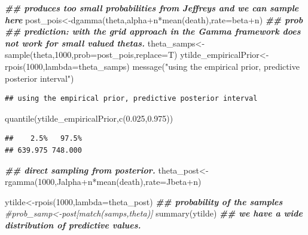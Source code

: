 \documentclass[
]{book}
\newenvironment{Shaded}{\begin{snugshade}}{\end{snugshade}}
\newcommand{\AttributeTok}[1]{\textcolor[rgb]{0.77,0.63,0.00}{#1}}
\newcommand{\CommentTok}[1]{\textcolor[rgb]{0.56,0.35,0.01}{\textit{#1}}}
\newcommand{\DecValTok}[1]{\textcolor[rgb]{0.00,0.00,0.81}{#1}}
\newcommand{\DocumentationTok}[1]{\textcolor[rgb]{0.56,0.35,0.01}{\textbf{\textit{#1}}}}
\newcommand{\FloatTok}[1]{\textcolor[rgb]{0.00,0.00,0.81}{#1}}
\newcommand{\FunctionTok}[1]{\textcolor[rgb]{0.00,0.00,0.00}{#1}}
\newcommand{\NormalTok}[1]{#1}
\newcommand{\OtherTok}[1]{\textcolor[rgb]{0.56,0.35,0.01}{#1}}
\newcommand{\SpecialCharTok}[1]{\textcolor[rgb]{0.00,0.00,0.00}{#1}}
\newcommand{\StringTok}[1]{\textcolor[rgb]{0.31,0.60,0.02}{#1}}
\theoremstyle{definition}
\theoremstyle{definition}
\theoremstyle{definition}
\theoremstyle{definition}
\theoremstyle{remark}
\begin{document}
\begin{Shaded}
\begin{Highlighting}[]
 \DocumentationTok{\#\# produces too small probabilities from Jeffrey\textquotesingle{}s and we can sample here}
\NormalTok{ post\_pois}\OtherTok{\textless{}{-}}\FunctionTok{dgamma}\NormalTok{(theta,alpha}\SpecialCharTok{+}\NormalTok{n}\SpecialCharTok{*}\FunctionTok{mean}\NormalTok{(death),}\AttributeTok{rate=}\NormalTok{beta}\SpecialCharTok{+}\NormalTok{n) }\DocumentationTok{\#\# prob}
\DocumentationTok{\#\#  prediction:  with the grid approach in the Gamma framework does not work for small valued thetas.}
\NormalTok{ theta\_samps}\OtherTok{\textless{}{-}}\FunctionTok{sample}\NormalTok{(theta,}\DecValTok{1000}\NormalTok{,}\AttributeTok{prob=}\NormalTok{post\_pois,}\AttributeTok{replace=}\NormalTok{T)}
\NormalTok{  ytilde\_empiricalPrior}\OtherTok{\textless{}{-}}\FunctionTok{rpois}\NormalTok{(}\DecValTok{1000}\NormalTok{,}\AttributeTok{lambda=}\NormalTok{theta\_samps)}
  \FunctionTok{message}\NormalTok{(}\StringTok{"using the empirical prior, predictive posterior interval"}\NormalTok{)}
\end{Highlighting}
\end{Shaded}

\begin{verbatim}
## using the empirical prior, predictive posterior interval
\end{verbatim}

\begin{Shaded}
\begin{Highlighting}[]
   \FunctionTok{quantile}\NormalTok{(ytilde\_empiricalPrior,}\FunctionTok{c}\NormalTok{(}\FloatTok{0.025}\NormalTok{,}\FloatTok{0.975}\NormalTok{))}
\end{Highlighting}
\end{Shaded}

\begin{verbatim}
##    2.5%   97.5% 
## 639.975 748.000
\end{verbatim}

\begin{Shaded}
\begin{Highlighting}[]
 \DocumentationTok{\#\# direct sampling from posterior.}
\NormalTok{ theta\_post}\OtherTok{\textless{}{-}}\FunctionTok{rgamma}\NormalTok{(}\DecValTok{1000}\NormalTok{,Jalpha}\SpecialCharTok{+}\NormalTok{n}\SpecialCharTok{*}\FunctionTok{mean}\NormalTok{(death),}\AttributeTok{rate=}\NormalTok{Jbeta}\SpecialCharTok{+}\NormalTok{n)}
 
 
\NormalTok{   ytilde}\OtherTok{\textless{}{-}}\FunctionTok{rpois}\NormalTok{(}\DecValTok{1000}\NormalTok{,}\AttributeTok{lambda=}\NormalTok{theta\_post) }
 \DocumentationTok{\#\# probability of the samples }
 \CommentTok{\#prob\_samp\textless{}{-}post[match(samps,theta)]}
  \FunctionTok{summary}\NormalTok{(ytilde) }\DocumentationTok{\#\# we have a wide distribution of predictive values.}
\end{Highlighting}
\end{Shaded}
\end{document}
